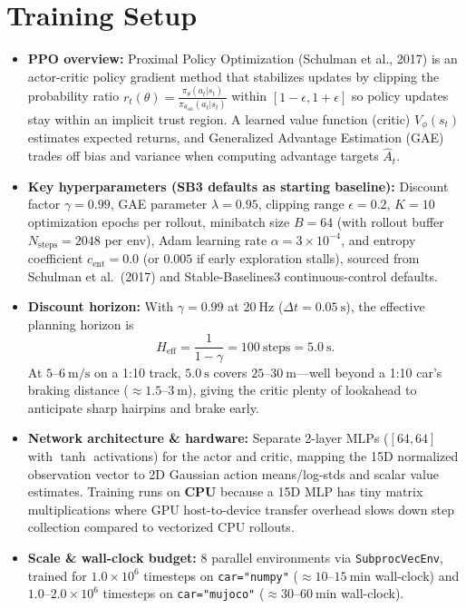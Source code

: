 \documentclass[11pt]{article}
\begin{document}
\section{Training Setup}
\begin{itemize}[leftmargin=1.5em, itemsep=0.25em]
    \item \textbf{PPO overview:} Proximal Policy Optimization (Schulman et al., 2017) is an actor-critic policy gradient method that stabilizes updates by clipping the probability ratio $r_t(\theta) = \frac{\pi_\theta(a_t|s_t)}{\pi_{\theta_{\text{old}}}(a_t|s_t)}$ within $[1-\epsilon, 1+\epsilon]$ so policy updates stay within an implicit trust region. A learned value function (critic) $V_\phi(s_t)$ estimates expected returns, and Generalized Advantage Estimation (GAE) trades off bias and variance when computing advantage targets $\hat{A}_t$.
    \item \textbf{Key hyperparameters (SB3 defaults as starting baseline):} Discount factor $\gamma = 0.99$, GAE parameter $\lambda = 0.95$, clipping range $\epsilon = 0.2$, $K = 10$ optimization epochs per rollout, minibatch size $B = 64$ (with rollout buffer $N_{\text{steps}} = 2048$ per env), Adam learning rate $\alpha = 3 \times 10^{-4}$, and entropy coefficient $c_{\text{ent}} = 0.0$ (or $0.005$ if early exploration stalls), sourced from Schulman et al.\ (2017) and Stable-Baselines3 continuous-control defaults.
    \item \textbf{Discount horizon:} With $\gamma = 0.99$ at $20~\text{Hz}$ ($\Delta t = 0.05~\text{s}$), the effective planning horizon is
    \[
        H_{\text{eff}} = \frac{1}{1 - \gamma} = 100~\text{steps} = 5.0~\text{s}.
    \]
    At $5\text{--}6~\text{m/s}$ on a 1:10 track, $5.0~\text{s}$ covers $25\text{--}30~\text{m}$---well beyond a 1:10 car's braking distance ($\approx 1.5\text{--}3~\text{m}$), giving the critic plenty of lookahead to anticipate sharp hairpins and brake early.
    \item \textbf{Network architecture \& hardware:} Separate 2-layer MLPs ($[64, 64]$ with $\tanh$ activations) for the actor and critic, mapping the 15D normalized observation vector to 2D Gaussian action means/log-stds and scalar value estimates. Training runs on \textbf{CPU} because a 15D MLP has tiny matrix multiplications where GPU host-to-device transfer overhead slows down step collection compared to vectorized CPU rollouts.
    \item \textbf{Scale \& wall-clock budget:} $8$ parallel environments via \texttt{SubprocVecEnv}, trained for $1.0 \times 10^6$ timesteps on \texttt{car="numpy"} ($\approx 10\text{--}15~\text{min}$ wall-clock) and $1.0\text{--}2.0 \times 10^6$ timesteps on \texttt{car="mujoco"} ($\approx 30\text{--}60~\text{min}$ wall-clock).

\end{itemize}
\end{document}
